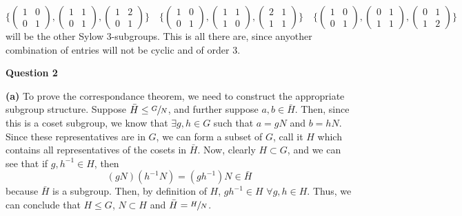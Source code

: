 \documentclass[10pt]{article}
\begin{document}
\[ \{(\begin{smallmatrix}1 & 0 \\ 0 & 1 \end{smallmatrix}),(\begin{smallmatrix}1 & 1 \\ 0 & 1 \end{smallmatrix}),(\begin{smallmatrix}1 & 2 \\0 & 1 \end{smallmatrix}) \} \quad \{(\begin{smallmatrix}1 & 0 \\ 0 & 1 \end{smallmatrix}),(\begin{smallmatrix}1 & 1 \\ 1 & 0 \end{smallmatrix}),(\begin{smallmatrix}2 & 1 \\1 & 1 \end{smallmatrix}) \} \quad \{(\begin{smallmatrix}1 & 0 \\ 0 & 1 \end{smallmatrix}),(\begin{smallmatrix}0 & 1 \\ 1 & 1 \end{smallmatrix}),(\begin{smallmatrix}0 & 1 \\ 1 &2 \end{smallmatrix}) \}\]
will be the other Sylow 3-subgroups. This is all there are, since anyother combination of entries will not be cyclic and of order 3.

\newpage
\textbf{Question 2}

\textbf{(a)} To prove the correspondance theorem, we need to construct the appropriate subgroup structure. Suppose $\bar{H} \leq \sfrac{G}{N}$, and further suppose $a,b \in \bar{H}$. Then, since this is a coset subgroup, we know that $\exists g,h \in G$ such that $a = gN$ and $b = hN$. Since these representatives are in $G$, we can form a subset of $G$, call it $H$ which contains all representatives of the cosets in $\bar{H}$. Now, clearly $H \subset G$, and we can see that if $g,h^{-1}\in H$, then
\[ (gN)(h^{-1}N) = (gh^{-1})N \in \bar{H} \]
because $\bar{H}$ is a subgroup. Then, by definition of $H$, $gh^{-1}\in H$ $\forall g,h \in H$. Thus, we can conclude that $H\leq G$, $N \subset H$ and $\bar{H} = \sfrac{H}{N}$.
\end{document}

